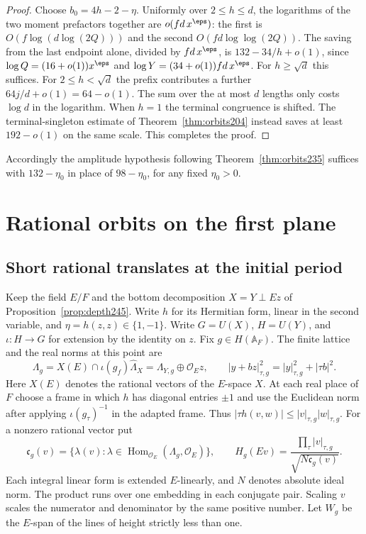 \documentclass[a4paper,11pt]{article}
\theoremstyle{definition}
\theoremstyle{remark}
\numberwithin{equation}{section}
\begin{document}
\begin{proof}
Choose \(b_0=4h-2-\eta\). Uniformly over \(2\le h\le d\),
the logarithms of the two moment prefactors together are
\(o(fd\,x^\eps)\): the first is \(O(f\log(d\log(2Q)))\)
and the second \(O(fd\log\log(2Q))\). The saving from the
last endpoint alone, divided by \(fd\,x^\eps\), is
\(132-34/h+o(1)\), since \(\log Q=(16+o(1))x^\eps\) and
\(\log Y=(34+o(1))fd\,x^\eps\). For \(h\ge\sqrt d\) this
suffices. For \(2\le h<\sqrt d\) the prefix contributes a
further \(64j/d+o(1)=64-o(1)\). The sum over the at most \(d\)
lengths only costs \(\log d\) in the logarithm. When \(h=1\)
the terminal congruence is shifted. The terminal-singleton
estimate of Theorem~\ref{thm:orbits204}
instead saves at least \(192-o(1)\) on the same scale.
This completes the proof.
\end{proof}

Accordingly the amplitude hypothesis following
Theorem~\ref{thm:orbits235} suffices with \(132-\eta_0\) in
place of \(98-\eta_0\), for any fixed \(\eta_0>0\).

\section{Rational orbits on the first plane}\label{nav:g-XI-2}

\subsection{Short rational translates at the initial period}\label{nav:IX-34}
Keep the field \(E/F\) and the bottom decomposition \(X=Y\perp Ez\)
of Proposition~\ref{prop:depth245}. Write \(h\) for its Hermitian form,
linear in the second variable, and \(\eta=h(z,z)\in\{1,-1\}\).
Write \(G=U(X)\), \(H=U(Y)\), and \(\iota:H\to G\) for extension
by the identity on \(z\). Fix \(g\in H(\mathbb A_F)\). The finite
lattice and the real norms at this point are
\[
 \Lambda_g=X(E)\cap\iota(g_f)\widehat\Lambda_X
           =\Lambda_{Y,g}\oplus\mathcal O_Ez,\qquad
 |y+bz|_{\tau,g}^2=|y|_{\tau,g}^2+|\tau b|^2 .
\]
Here \(X(E)\) denotes the rational vectors of the \(E\)-space \(X\).
At each real place of \(F\) choose a frame in which \(h\) has
diagonal entries \(\pm1\) and use the Euclidean norm after applying
\(\iota(g_\tau)^{-1}\) in the adapted frame. Thus
\(|\tau h(v,w)|\le |v|_{\tau,g}|w|_{\tau,g}\).
For a nonzero rational vector put
\[
 \mathfrak c_g(v)=
 \{\lambda(v):\lambda\in\operatorname{Hom}_{\mathcal O_E}
                    (\Lambda_g,\mathcal O_E)\},\qquad
 H_g(Ev)=\frac{\prod_\tau |v|_{\tau,g}}{\sqrt{N\mathfrak c_g(v)}}.
\]
Each integral linear form is extended \(E\)-linearly, and \(N\)
denotes absolute ideal norm. The product runs over one embedding
in each conjugate pair. Scaling \(v\) scales the numerator and
denominator by the same positive number. Let \(W_g\) be the
\(E\)-span of the lines of height strictly less than one.
\end{document}
